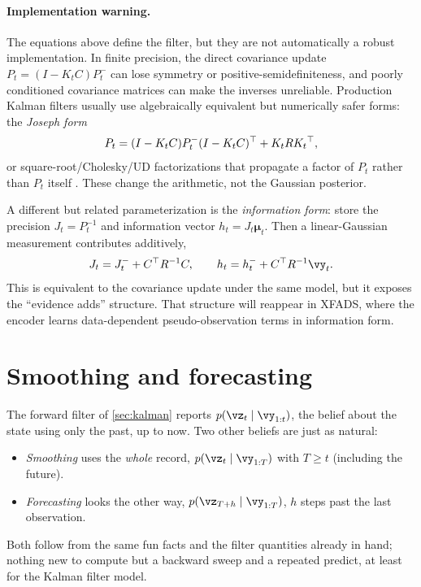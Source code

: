\documentclass[11pt]{article}
\theoremstyle{plain}
\theoremstyle{definition}
\theoremstyle{remark}
\theoremstyle{definition}
\newcommand{\vmu}{\bm{\mu}}
\begin{document}
\paragraph{Implementation warning.} The equations above define the filter, but
they are not automatically a robust implementation. In finite precision, the
direct covariance update $P_t = (I - K_tC)P_t^-$ can lose symmetry or
positive-semidefiniteness, and poorly conditioned covariance matrices can make
the inverses unreliable. Production Kalman filters usually use algebraically
equivalent but numerically safer forms: the \emph{Joseph form}
\begin{equation}
    P_t = (I - K_tC)P_t^-(I - K_tC){^\top} + K_t R K_t{^\top} ,
\end{equation}
or square-root/Cholesky/UD factorizations that propagate a factor of $P_t$
rather than $P_t$ itself \parencite{Bierman1977-fm,Kailath2000-le,Sarkka2013-bfs}.
These change the arithmetic, not the Gaussian posterior.

A different but related parameterization is the \emph{information form}: store the
precision $J_t = P_t^{-1}$ and information vector $h_t = J_t\vmu_t$. Then a
linear-Gaussian measurement contributes additively,
\begin{equation}
    J_t = J_t^- + C\trp R^{-1}C, \qquad
    h_t = h_t^- + C\trp R^{-1}\vy_t .
\end{equation}
This is equivalent to the covariance update under the same model, but it exposes
the ``evidence adds'' structure. That structure will reappear in XFADS, where the
encoder learns data-dependent pseudo-observation terms in information form.

\section{Smoothing and forecasting}\label{sec:smoothing}

The forward filter of \cref{sec:kalman} reports $p(\vz_t \mid \vy_{1:t})$, the
belief about the state using only the past, up to now. Two other beliefs are just
as natural:
\begin{itemize}
    \item \emph{Smoothing} uses the \emph{whole} record, $p(\vz_t \mid
	\vy_{1:T})$ with $T \geq t$ (including the future).
    \item \emph{Forecasting} looks the other way, $p(\vz_{T+h} \mid \vy_{1:T})$,
	$h$ steps past the last observation.
\end{itemize}
Both follow from the
same fun facts and the filter quantities already in hand; nothing new to compute
but a backward sweep and a repeated predict, at least for the Kalman filter model.
\end{document}
